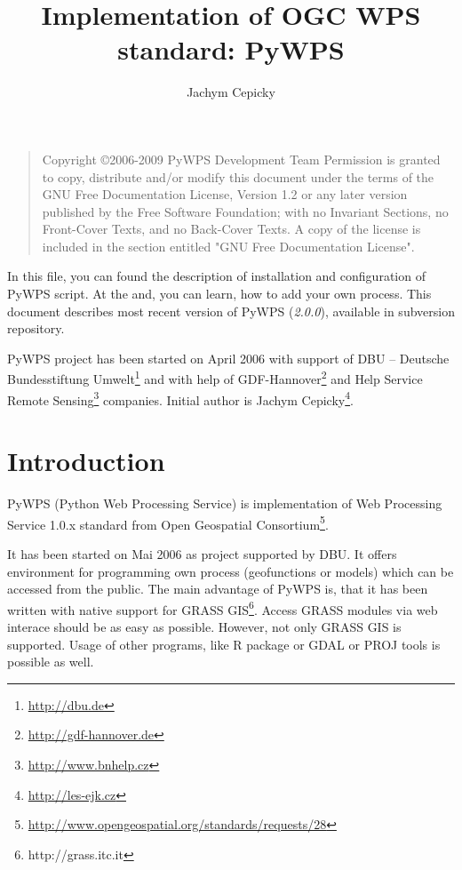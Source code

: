 \documentclass[a4paper,11pt]{article}
\author{Jachym Cepicky}
\title{Implementation of OGC WPS standard: PyWPS}
\newcommand{\version}{\emph{2.0.0}}
\begin{document}
\maketitle{}

\bigskip
\begin{quote}
    Copyright \copyright  2006-2009 PyWPS Development Team
    Permission is granted to copy, distribute and/or modify this document
    under the terms of the GNU Free Documentation License, Version 1.2
    or any later version published by the Free Software Foundation;
    with no Invariant Sections, no Front-Cover Texts, and no Back-Cover Texts.
    A copy of the license is included in the section entitled "GNU
    Free Documentation License".
\end{quote}
\bigskip


In this file, you can found the description of installation and
configuration of PyWPS script. At the and, you can learn, how to add
your own process. This document describes most recent
version of PyWPS (\version), available in subversion repository.

PyWPS project has been started on April 2006 with support of DBU --
Deutsche Bundesstiftung Umwelt\footnote{\url{http://dbu.de}} and with help of
GDF-Hannover\footnote{\url{http://gdf-hannover.de}} and Help Service Remote
Sensing\footnote{\url{http://www.bnhelp.cz}} companies. Initial author is Jachym
Cepicky\footnote{\url{http://les-ejk.cz}}.
    

    \tableofcontents

\newpage

\section{Introduction}
PyWPS (Python Web Processing Service) is implementation of Web
Processing Service 1.0.x standard from Open Geospatial
Consortium\footnote{\url{http://www.opengeospatial.org/standards/requests/28}}.

It has been started on Mai 2006 as project supported by DBU. It offers
environment for programming own process (geofunctions or models) which can
be accessed from the public. The main advantage of PyWPS is, that it has
been written with native support for GRASS
GIS\footnote{http://grass.itc.it}. Access GRASS modules via web
interace should be as easy as possible.
However, not only GRASS GIS is supported. Usage of other programs, like
R package or GDAL or PROJ tools is possible as well.
\end{document}
